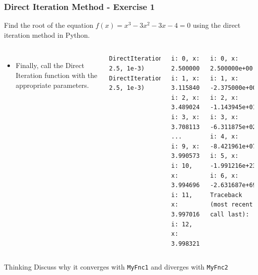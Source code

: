 

\begin{frame}[fragile]
  \frametitle{Direct Iteration Method - Exercise 1}

  Find the root of the equation
  \(
  f(x) = x^3 - 3x^2 - 3x - 4 = 0
  \)
  using the direct iteration method in Python.

\begin{columns}[t]
  \begin{itemize}
    \item Finally, call the Direct Iteration function with the appropriate parameters.
  \end{itemize}
  \begin{lstlisting}
DirectIterationMethod(MyFnc1, 2.5, 1e-3)
DirectIterationMethod(MyFnc2, 2.5, 1e-3)
  \end{lstlisting}
  \pause
    \begin{lstlisting}[style=PyOutput]
i: 0, x: 2.500000e+00
i: 1, x: 3.115840e+00
i: 2, x: 3.489024e+00
i: 3, x: 3.708113e+00
...
i: 9, x: 3.990573e+00
i: 10, x: 3.994696e+00
i: 11, x: 3.997016e+00
i: 12, x: 3.998321e+00
    \end{lstlisting}
    \pause
    \begin{lstlisting}[style=PyOutput]
i: 0, x: 2.500000e+00
i: 1, x: -2.375000e+00
i: 2, x: -1.143945e+01
i: 3, x: -6.311875e+02
i: 4, x: -8.421961e+07
i: 5, x: -1.991216e+23
i: 6, x: -2.631687e+69
Traceback (most recent call last):
    \end{lstlisting}
    
\end{columns}
\pause
  \begin{block}{Thinking}
  Discuss why it converges with \texttt{MyFnc1} and diverges with \texttt{MyFnc2}
  \end{block}
\end{frame}


